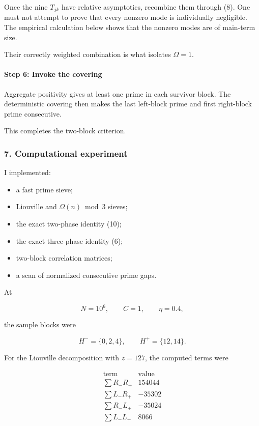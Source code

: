 Once the nine \(T_{jk}\) have relative asymptotics, recombine them through (8). One must not attempt to prove that every nonzero mode is individually negligible. The empirical calculation below shows that the nonzero modes are of main-term size.

Their correctly weighted combination is what isolates \(\Omega=1\).

\paragraph{Step 6: Invoke the covering}

Aggregate positivity gives at least one prime in each survivor block. The deterministic covering then makes the last left-block prime and first right-block prime consecutive.

This completes the two-block criterion.

\medskip
\medskip


\subsubsection*{7. Computational experiment}

I implemented:

\begin{itemize}
\item a fast prime sieve;
\item Liouville and \(\Omega(n)\bmod3\) sieves;
\item the exact two-phase identity (10);
\item the exact three-phase identity (6);
\item two-block correlation matrices;
\item a scan of normalized consecutive prime gaps.
\end{itemize}

At

\[
N=10^6,\qquad C=1,\qquad \eta=0.4,
\]

the sample blocks were

\[
H^-=\{0,2,4\},
\qquad
H^+=\{12,14\}.
\]

For the Liouville decomposition with \(z=127\), the computed terms were

\[
\begin{array}{c|r}
\text{term}&\text{value}\\ \hline
\sum R_-R_+&154044\\
\sum L_-R_+&-35302\\
\sum R_-L_+&-35024\\
\sum L_-L_+&8066
\end{array}
\]

